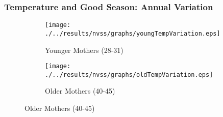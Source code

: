 \documentclass[10pt,letterpaper,subeqn]{beamer}
\begin{document}
\begin{frame}
\frametitle{Temperature and Good Season: Annual Variation}
\begin{figure}[htpb!]
\begin{center}
\label{fig:tempUSA}
\begin{subfigure}{.5\textwidth}
  \centering
  \texttt{[image: ./../results/nvss/graphs/youngTempVariation.eps]}
  \caption{Younger Mothers (28-31)}
  \label{fig:tempUSAYoung}
\end{subfigure}%
\begin{subfigure}{.5\textwidth}
  \centering
  \texttt{[image: ./../results/nvss/graphs/oldTempVariation.eps]}
  \caption{Older Mothers (40-45)}
  \label{fig:tempUSAOld}
\end{subfigure}
\end{center}
\end{figure}

\vspace{8mm}
\hyperlink{weather}{}
\end{frame}
\end{document}
